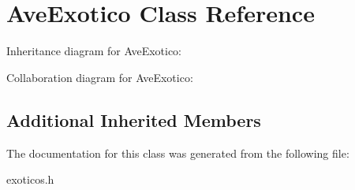 \hypertarget{classAveExotico}{}\section{Ave\+Exotico Class Reference}
\label{classAveExotico}


Inheritance diagram for Ave\+Exotico\+:


Collaboration diagram for Ave\+Exotico\+:
\subsection*{Additional Inherited Members}


The documentation for this class was generated from the following file\+:\begin{DoxyCompactItemize}
\item 
exoticos.\+h\end{DoxyCompactItemize}
